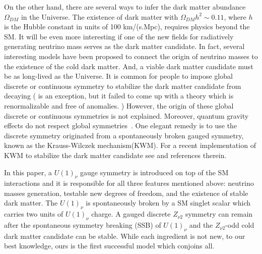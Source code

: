 \documentclass[aps,prd,preprint,nofootinbib]{revtex4}
\begin{document}
 On the other
hand,  there are several ways to infer the dark matter abundance
$\Omega_{DM}$ in the Universe\cite{DarkMatter}. The existence of
dark matter with $\Omega_{DM} h^2\sim 0.11$, where $h$ is the
Hubble constant in units of 100 km/(s.Mpc), requires physics
beyond the SM. It will be even more interesting if  one of
the new fields for radiatively generating neutrino mass serves as
the dark matter candidate. In fact, several interesting models
have been proposed to connect the origin of neutrino masses to the
existence of the cold dark matter\cite{NuDMold,Kubo:2006rm}.
And, a viable dark matter candidate  must be as long-lived as the
Universe. It is common for people to impose global discrete or
continuous symmetry to stabilize the dark matter candidate from
decaying ( \cite{Kubo:2006rm} is an exception, but it failed to
 come up with a  theory which is renormalizable and free of anomalies. )
  However, the origin of these global discrete or continuous symmetries is not explained.
Moreover,  quantum gravity effects do not respect global symmetries~\cite{Krauss:1988zc}.
One elegant remedy  is to use the  discrete symmetry originated from a spontaneously broken gauged symmetry,
known as the Krauss-Wilczek mechanism(KWM)\cite{Krauss:1988zc}. For a recent implementation of KWM
to stabilize the dark matter candidate see \cite{Batell:2010bp} and references therein.


In this paper, a $U(1)_\nu$ gauge symmetry is introduced on top of
the SM interactions and it is responsible for all three features
mentioned above: neutrino masses generation, testable new degrees
of freedom, and the existence of stable dark matter. The
$U(1)_\nu$  is spontaneously broken by a SM singlet scalar which
carries two units of $U(1)_\nu$ charge. A gauged discrete $Z_{\nu
2}$ symmetry can remain after the spontaneous symmetry breaking
(SSB) of $U(1)_\nu$ and the $Z_{\nu 2}$-odd cold dark matter
candidate can be stable.  While each ingredient is not new, to
our best knowledge, ours is the first successful model which
conjoins all.
\end{document}
